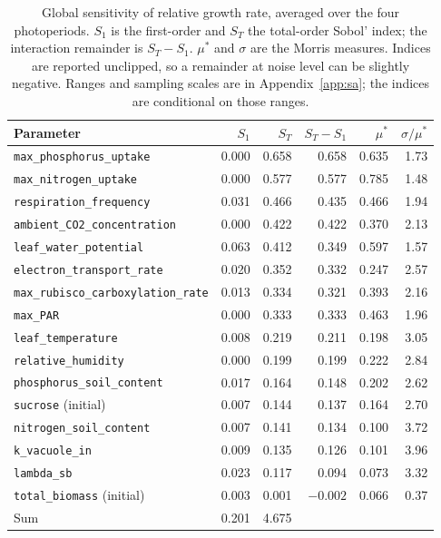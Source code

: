 \begin{table}[!htbp]
\centering
\caption{Global sensitivity of relative growth rate, averaged over the four
photoperiods. $S_1$ is the first-order and $S_T$ the total-order Sobol' index;
the interaction remainder is $S_T - S_1$. $\mu^{*}$ and $\sigma$ are the
Morris measures. Indices are reported unclipped, so a remainder at noise level
can be slightly negative. Ranges and sampling scales are in
Appendix~\ref{app:sa}; the indices are conditional on those ranges.}
\label{tab:sens}
\footnotesize
\begin{tabular}{@{}lrrrrr@{}}
\toprule
Parameter & $S_1$ & $S_T$ & $S_T-S_1$ & $\mu^{*}$ & $\sigma/\mu^{*}$ \\
\midrule
\texttt{max\_phosphorus\_uptake}   & 0.000 & 0.658 & 0.658 & 0.635 & 1.73 \\
\texttt{max\_nitrogen\_uptake}     & 0.000 & 0.577 & 0.577 & 0.785 & 1.48 \\
\texttt{respiration\_frequency}    & 0.031 & 0.466 & 0.435 & 0.466 & 1.94 \\
\texttt{ambient\_CO2\_concentration} & 0.000 & 0.422 & 0.422 & 0.370 & 2.13 \\
\texttt{leaf\_water\_potential}    & 0.063 & 0.412 & 0.349 & 0.597 & 1.57 \\
\texttt{electron\_transport\_rate} & 0.020 & 0.352 & 0.332 & 0.247 & 2.57 \\
\texttt{max\_rubisco\_carboxylation\_rate} & 0.013 & 0.334 & 0.321 & 0.393 & 2.16 \\
\texttt{max\_PAR}                  & 0.000 & 0.333 & 0.333 & 0.463 & 1.96 \\
\texttt{leaf\_temperature}         & 0.008 & 0.219 & 0.211 & 0.198 & 3.05 \\
\texttt{relative\_humidity}        & 0.000 & 0.199 & 0.199 & 0.222 & 2.84 \\
\texttt{phosphorus\_soil\_content} & 0.017 & 0.164 & 0.148 & 0.202 & 2.62 \\
\texttt{sucrose} (initial)         & 0.007 & 0.144 & 0.137 & 0.164 & 2.70 \\
\texttt{nitrogen\_soil\_content}   & 0.007 & 0.141 & 0.134 & 0.100 & 3.72 \\
\texttt{k\_vacuole\_in}            & 0.009 & 0.135 & 0.126 & 0.101 & 3.96 \\
\texttt{lambda\_sb}                & 0.023 & 0.117 & 0.094 & 0.073 & 3.32 \\
\texttt{total\_biomass} (initial)  & 0.003 & 0.001 & $-0.002$ & 0.066 & 0.37 \\
\midrule
Sum & 0.201 & 4.675 & & & \\
\bottomrule
\end{tabular}
\end{table}

